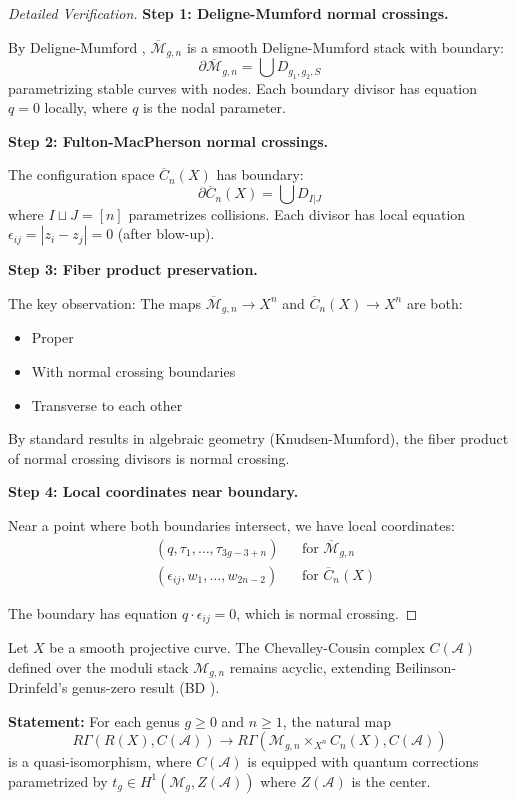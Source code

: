 \begin{proof}[Detailed Verification]
\textbf{Step 1: Deligne-Mumford normal crossings.}

By Deligne-Mumford \cite{DM69}, $\overline{\mathcal{M}}_{g,n}$ is a smooth Deligne-Mumford stack with boundary:
$$\partial \overline{\mathcal{M}}_{g,n} = \bigcup D_{g_1, g_2, S}$$
parametrizing stable curves with nodes. Each boundary divisor has equation $q = 0$ locally, where $q$ is the nodal parameter.

\textbf{Step 2: Fulton-MacPherson normal crossings.}

The configuration space $\overline{C}_n(X)$ has boundary:
$$\partial \overline{C}_n(X) = \bigcup D_{I|J}$$
where $I \sqcup J = [n]$ parametrizes collisions. Each divisor has local equation $\epsilon_{ij} = |z_i - z_j| = 0$ (after blow-up).

\textbf{Step 3: Fiber product preservation.}

The key observation: The maps $\overline{\mathcal{M}}_{g,n} \to X^n$ and $\overline{C}_n(X) \to X^n$ are both:
\begin{itemize}
\item Proper
\item With normal crossing boundaries
\item Transverse to each other
\end{itemize}

By standard results in algebraic geometry (Knudsen-Mumford), the fiber product of normal crossing divisors is normal crossing.

\textbf{Step 4: Local coordinates near boundary.}

Near a point where both boundaries intersect, we have local coordinates:
\begin{align*}
&(q, \tau_1, \ldots, \tau_{3g-3+n}) && \text{for } \overline{\mathcal{M}}_{g,n} \\
&(\epsilon_{ij}, w_1, \ldots, w_{2n-2}) && \text{for } \overline{C}_n(X)
\end{align*}

The boundary has equation $q \cdot \epsilon_{ij} = 0$, which is normal crossing. \qedhere
\end{proof}

\begin{theorem}\label{thm:CC-acyclicity-higher-genus}
Let $X$ be a smooth projective curve. The Chevalley-Cousin complex $C(\mathcal{A})$ 
defined over the moduli stack $\mathcal{M}_{g,n}$ remains acyclic, extending 
Beilinson-Drinfeld's genus-zero result (BD \cite[Theorem 3.4.12]{BD04}).

\textbf{Statement:} For each genus $g \geq 0$ and $n \geq 1$, the natural map
$$R\Gamma(R(X), C(\mathcal{A})) \to R\Gamma(\mathcal{M}_{g,n} \times_{X^n} C_n(X), C(\mathcal{A}))$$
is a quasi-isomorphism, where $C(\mathcal{A})$ is equipped with quantum corrections 
parametrized by $t_g \in H^1(\mathcal{M}_g, Z(\mathcal{A}))$ where $Z(\mathcal{A})$ is the center.
\end{theorem}

